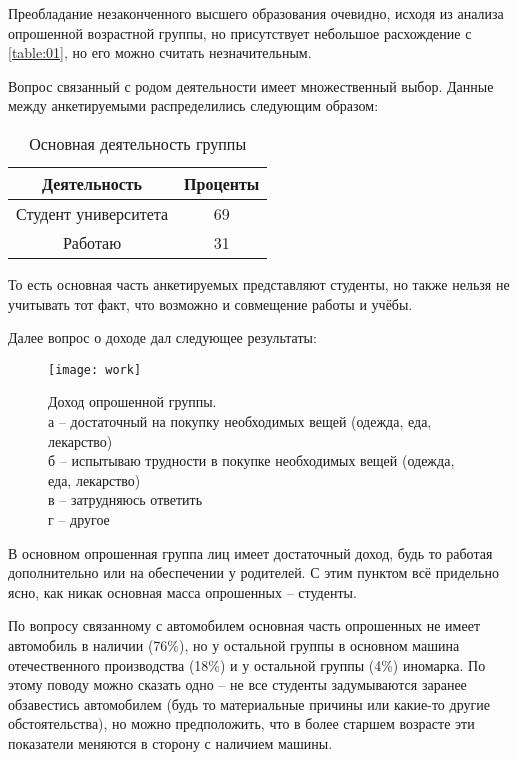 Преобладание незаконченного высшего образования очевидно, исходя из анализа 
опрошенной возрастной группы, но присутствует небольшое расхождение с 
\ref{table:01}, но его можно считать незначительным.

Вопрос связанный с родом деятельности имеет множественный выбор. Данные между 
анкетируемыми распределились следующим образом:
\begin{table}[H]
    \centering
    \begin{tabular}{|c|c|}
        \hline
        Деятельность & Проценты \\ \hline \hline
        Студент университета & 69 \\ \hline
        Работаю & 31 \\ \hline
    \end{tabular}
    \caption{Основная деятельность группы}
\end{table}

То есть основная часть анкетируемых представляют студенты, но также нельзя не 
учитывать тот факт, что возможно и совмещение работы и учёбы.

Далее вопрос о доходе дал следующее результаты:
\begin{figure}[H]
    \centering
    \texttt{[image: work]} \\
    \caption{Доход опрошенной группы. \\
        а -- достаточный на покупку необходимых 
        вещей (одежда, еда, лекарство)\\
        б -- испытываю трудности в покупке 
        необходимых вещей (одежда, еда, лекарство)\\
        в -- затрудняюсь ответить \\
        г -- другое 
    }
\end{figure}

В основном опрошенная группа лиц имеет достаточный доход, будь то работая 
дополнительно или на обеспечении у родителей. С этим пунктом всё придельно 
ясно, как никак основная масса опрошенных -- студенты.

По вопросу связанному с автомобилем основная часть опрошенных не имеет 
автомобиль в наличии (76\%), но у остальной группы в основном машина 
отечественного производства (18\%) и у остальной группы (4\%) иномарка. 
По этому поводу можно сказать одно -- не все студенты задумываются заранее 
обзавестись автомобилем (будь то материальные причины или какие-то другие 
обстоятельства), но можно предположить, что в более старшем возрасте эти 
показатели меняются в сторону с наличием машины.

